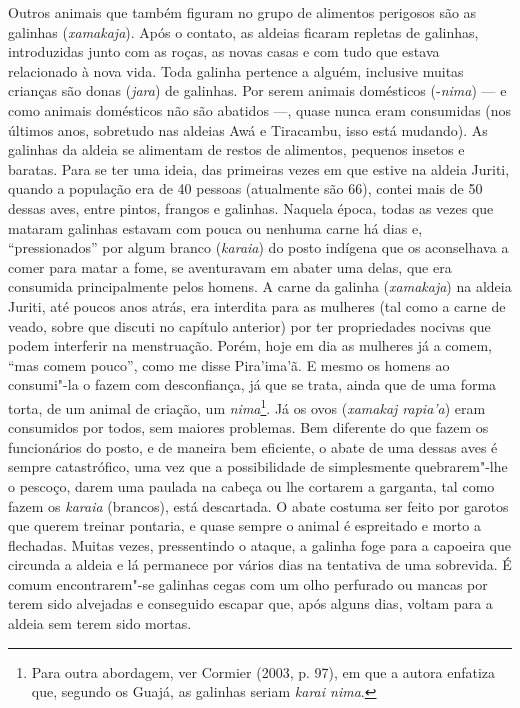 Outros animais que também figuram no grupo de alimentos perigosos são as
galinhas (\emph{xamakaja}). Após o contato, as aldeias ficaram repletas
de galinhas, introduzidas junto com as roças, as novas casas e com tudo
que estava relacionado à nova vida. Toda galinha pertence a alguém,
inclusive muitas crianças são donas (\emph{jara}) de galinhas. Por serem
animais domésticos (-\emph{nima}) --- e como animais domésticos não são
abatidos ---, quase nunca eram consumidas (nos últimos anos, sobretudo nas
aldeias Awá e Tiracambu, isso está mudando). As galinhas da aldeia se
alimentam de restos de alimentos, pequenos insetos e baratas. Para se
ter uma ideia, das primeiras vezes em que estive na aldeia Juriti,
quando a população era de 40 pessoas (atualmente são 66), contei mais de
50 dessas aves, entre pintos, frangos e galinhas. Naquela época, todas
as vezes que mataram galinhas estavam com pouca ou nenhuma carne há dias
e, ``pressionados'' por algum branco (\emph{karaia}) do posto indígena que
os aconselhava a comer para matar a fome, se aventuravam em abater uma
delas, que era consumida principalmente pelos homens. A carne da galinha
(\emph{xamakaja}) na aldeia Juriti, até poucos anos atrás, era interdita
para as mulheres (tal como a carne de veado, sobre que discuti no
capítulo anterior) por ter propriedades nocivas que podem interferir na
menstruação. Porém, hoje em dia as mulheres já a comem, ``mas comem
pouco'', como me disse Pira'ima'ã. E mesmo os homens ao consumi"-la o
fazem com desconfiança, já que se trata, ainda que de uma forma torta,
de um animal de criação, um \emph{nima}\footnote{Para outra abordagem,
  ver Cormier (2003, p. 97), em que a autora enfatiza que, segundo os
  Guajá, as galinhas seriam \emph{karai nima}.}. Já os ovos
(\emph{xamakaj rapia'a}) eram consumidos por todos, sem maiores
problemas. Bem diferente do que fazem os funcionários do posto, e de
maneira bem eficiente, o abate de uma dessas aves é sempre catastrófico,
uma vez que a possibilidade de simplesmente quebrarem"-lhe o pescoço,
darem uma paulada na cabeça ou lhe cortarem a garganta, tal como fazem
os \emph{karaia} (brancos), está descartada. O abate costuma ser feito
por garotos que querem treinar pontaria, e quase sempre o animal é
espreitado e morto a flechadas. Muitas vezes, pressentindo o ataque, a
galinha foge para a capoeira que circunda a aldeia e lá permanece por
vários dias na tentativa de uma sobrevida. É comum encontrarem"-se
galinhas cegas com um olho perfurado ou mancas por terem sido alvejadas
e conseguido escapar que, após alguns dias, voltam para a aldeia sem
terem sido mortas.

